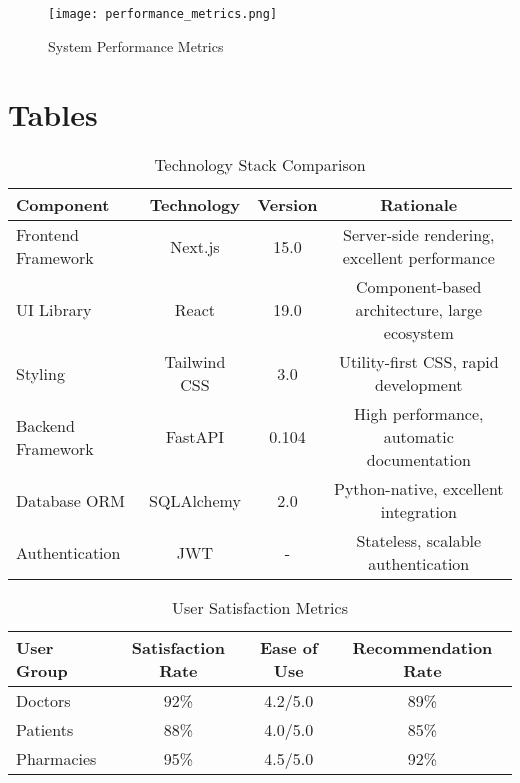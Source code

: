 \documentclass[12pt,a4paper]{article}
\begin{document}
\begin{figure}[H]
\centering
\texttt{[image: performance\_metrics.png]}
\caption{System Performance Metrics}
\label{fig:performance}
\end{figure}

\section{Tables}

\begin{table}[H]
\centering
\caption{Technology Stack Comparison}
\begin{tabular}{|l|c|c|c|}
\hline
\textbf{Component} & \textbf{Technology} & \textbf{Version} & \textbf{Rationale} \\
\hline
Frontend Framework & Next.js & 15.0 & Server-side rendering, excellent performance \\
UI Library & React & 19.0 & Component-based architecture, large ecosystem \\
Styling & Tailwind CSS & 3.0 & Utility-first CSS, rapid development \\
Backend Framework & FastAPI & 0.104 & High performance, automatic documentation \\
Database ORM & SQLAlchemy & 2.0 & Python-native, excellent integration \\
Authentication & JWT & - & Stateless, scalable authentication \\
\hline
\end{tabular}
\end{table}

\begin{table}[H]
\centering
\caption{User Satisfaction Metrics}
\begin{tabular}{|l|c|c|c|}
\hline
\textbf{User Group} & \textbf{Satisfaction Rate} & \textbf{Ease of Use} & \textbf{Recommendation Rate} \\
\hline
Doctors & 92\% & 4.2/5.0 & 89\% \\
Patients & 88\% & 4.0/5.0 & 85\% \\
Pharmacies & 95\% & 4.5/5.0 & 92\% \\
\hline
\end{tabular}
\end{table}
\end{document}
